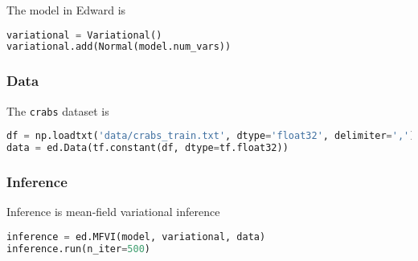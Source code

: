 The model in Edward is
\begin{lstlisting}[language=Python]
variational = Variational()
variational.add(Normal(model.num_vars))
\end{lstlisting}


\subsubsection{Data}

The \texttt{crabs} dataset is
\begin{lstlisting}[language=Python]
df = np.loadtxt('data/crabs_train.txt', dtype='float32', delimiter=',')[:25, :]
data = ed.Data(tf.constant(df, dtype=tf.float32))
\end{lstlisting}


\subsubsection{Inference}

Inference is mean-field variational inference
\begin{lstlisting}[language=Python]
inference = ed.MFVI(model, variational, data)
inference.run(n_iter=500)
\end{lstlisting}
